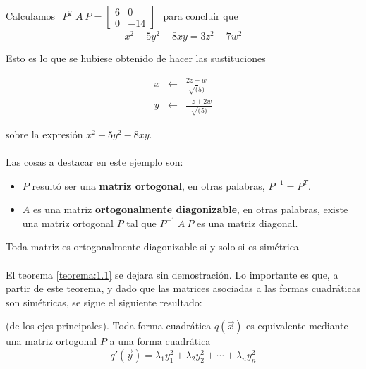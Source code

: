 \begin{example}
Calculamos $ \begin{matrix} 
    P^{T}~A~P = \begin{bmatrix}
6 & 0\\
0 & -14
\end{bmatrix}
    \end{matrix}$ para concluir que 
\begin{equation*}
x^{2} - 5y^{2} - 8xy = 3z^{2} - 7w^{2}
\end{equation*}

Esto es lo que se hubiese obtenido de hacer las sustituciones 

\begin{eqnarray*}
x & \leftarrow & \frac{2z + w}{\sqrt(5)}\\
y & \leftarrow & \frac{-z + 2w}{\sqrt(5)}
\end{eqnarray*}

sobre la expresión $x^{2} - 5y^{2} - 8xy$.
\end{example}

\paragraph*{}
Las cosas a destacar en este ejemplo son:
\begin{itemize}
    \item $P$ resultó ser una \textbf{matriz ortogonal}, en otras palabras, $P^{-1} = P^{T}$.
    \item $A$ es una matriz \textbf{ortogonalmente diagonizable}, en otras palabras, existe una matriz ortogonal $P$ tal que $P^{-1}~A~P$ es una matriz diagonal.
\end{itemize}

\begin{theorem}
Toda matriz es ortogonalmente diagonizable si y solo si es simétrica
\label{teorema:1.1}
\end{theorem}

\paragraph*{}
El teorema \ref{teorema:1.1} se dejara sin demostración. Lo importante es que, a partir de este teorema, y dado que las matrices asociadas a las formas cuadráticas son simétricas, se sigue el siguiente resultado:

\begin{theorem}(de los ejes principales).
Toda forma cuadrática $q(\overrightarrow{x})$ es equivalente mediante una matriz ortogonal $P$ a una forma cuadrática 
\begin{equation}
    q'(\overrightarrow{y}) = \lambda_{1}y_{1}^{2} + \lambda_{2}y_{2}^{2} + \cdots + \lambda_{n}y_{n}^{2}
\end{equation}
\label{teorema:1.2}
\end{theorem}

